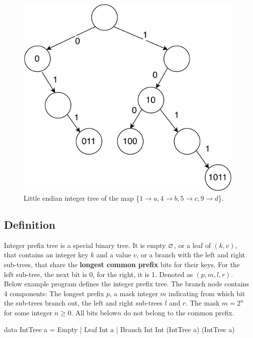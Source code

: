 \documentclass[b5paper]{article}
\begin{document}
\begin{figure}[htbp]
  \centering
  \includegraphics[scale=0.6, page=4]{img/trie}
  \caption{Little endian integer tree of the map
     \{$ 1 \rightarrow a, 4 \rightarrow b, 5 \rightarrow c, 9 \rightarrow d$\}.}
  \label{fig:little-endian-patricia}
\end{figure}

\subsection{Definition}

Integer prefix tree is a special binary tree. It is empty $\varnothing$, or a leaf of $(k, v)$, that contains an integer key $k$ and a value $v$, or a branch with the left and right sub-trees, that share the \textbf{longest common prefix} bits for their keys. For the left sub-tree, the next bit is 0, for the right, it is 1. Denoted as $(p, m, l, r)$. Below example program defines the integer prefix tree. The branch node contains 4 components: The longest prefix $p$, a mask integer $m$ indicating from which bit the sub-trees branch out, the left and right sub-trees $l$ and $r$. The mask $m = 2^n$ for some integer $n \geq 0$. All bits below$n$ do not belong to the common prefix.

\begin{Haskell}
data IntTree a = Empty
               | Leaf Int a
               | Branch Int Int (IntTree a) (IntTree a)
\end{Haskell}
\end{document}

